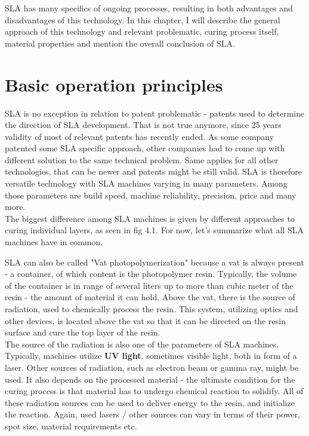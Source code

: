 \documentclass[a4paper, twoside, 11pt]{report}
\begin{document}
	SLA has many specifics of ongoing processes, resulting in both advantages and disadvantages of this technology. In this chapter, I will describe the general approach of this technology and relevant problematic, curing process itself, material properties and mention the overall conclusion of SLA.
\section{Basic operation principles}
SLA is no exception in relation to patent problematic - patents used to determine the direction of SLA development. That is not true anymore, since 25 years validity of most of relevant patents has recently ended. As some company patented some SLA specific approach, other companies had to come up with different solution to the same technical problem. Same applies for all other technologies, that can be newer and patents might be still valid. SLA is therefore versatile technology with SLA machines varying in many parameters. Among those parameters are build speed, machine reliability, precision, price and many more.\\
The biggest difference among SLA machines is given by different approaches to curing individual layers, as seen in fig 4.1. For now, let's summarize what all SLA machines have in common.

	SLA can also be called "Vat photopolymerization" because a vat is always present - a container, of which content is the photopolymer resin. Typically, the volume of the container is in range of several liters up to more than cubic meter of the resin - the amount of material it can hold. Above the vat, there is the source of radiation, used to chemically process the resin. This system, utilizing optics and other devices, is located above the vat so that it can be directed on the resin surface and cure the top layer of the resin.\\
The source of the radiation is also one of the parameters of SLA machines. Typically, machines utilize \textbf{UV light}, sometimes visible light, both in form of a laser. Other sources of radiation, such as electron beam or gamma ray, might be used. It also depends on the processed material - the ultimate condition for the curing process is that material has to undergo chemical reaction to solidify. All of these radiation sources can be used to deliver energy to the resin, and initialize the reaction. Again, used lasers / other sources can vary in terms of their power, spot size, material requirements etc.
\end{document}
